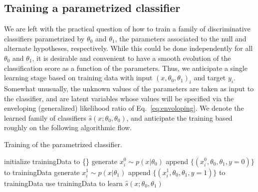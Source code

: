 \documentclass[aoas,preprint]{imsart}
\numberwithin{equation}{section}
\theoremstyle{plain}
\begin{document}




\subsection{Training a parametrized classifier}

We are left with the practical question of how to train a family of discriminative classifiers parametrized by $\theta_0$ and $\theta_1$, the 
parameters associated to the null and alternate hypotheses, respectively. While this could be done independently
for all $\theta_0$ and $\theta_1$, it is desirable and convenient to have a smooth evolution of the classification score as a function of the parameters. Thus, we anticipate a single learning stage based on training data with input $(x, \theta_0, \theta_1)_i$ and target $y_i$. Somewhat unusually, the unknown values of the parameters are taken
as input to the classifier, and are latent variables whose values will be specified via the enveloping (generalized) likelihood ratio of Eq.~\ref{eq:envoloping}. We denote the learned family of classifiers $\hat{s}(x; \theta_0, \theta_0)$, and anticipate the training based roughly on the following algorithmic flow.
\begin{algorithm}[ht]
\caption{Training of the parametrized classifier.}\label{alg:training}
\begin{algorithmic}
\STATE initialize trainingData to \{\}
		\STATE generate $x_i^0 \sim p(x|\theta_0)$
		\STATE append $\{ (x_i^0, \theta_0, \theta_1, y=0) \}$ to trainingData
		\STATE generate $x_i^1 \sim p(x|\theta_1)$
		\STATE append $\{ (x_i^1, \theta_0, \theta_1, y=1) \}$ to trainingData
	\ENDFOR
\ENDFOR
\STATE use trainingData to learn $\hat{s}(x; \theta_0, \theta_1)$
\end{algorithmic}
\end{algorithm}%
\end{document}
